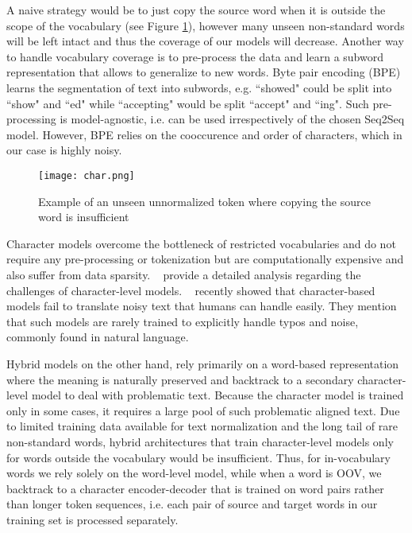 \documentclass[letterpaper]{article} \usepackage{aaai19}  \usepackage{times}  \usepackage{helvet} \usepackage{courier}  \usepackage[hyphens]{url}  \usepackage{graphicx} \urlstyle{rm} \def\UrlFont{\rm}  \usepackage{graphicx}  \frenchspacing  \setlength{\pdfpagewidth}{8.5in}  \setlength{\pdfpageheight}{11in}
\newcommand{\citet}[1]{\citeauthor{#1}~\shortcite{#1}}
\newcommand{\citep}{\cite}
\begin{document}
A naive strategy would be to just copy the source word when it is outside the scope of the vocabulary (see Figure \ref{fig:char}), however many unseen non-standard words will be left intact and thus the coverage of our models will decrease. Another way to handle vocabulary coverage is to pre-process the data and learn a subword representation that allows to generalize to new words. Byte pair encoding (BPE) \citep{sennrich2015neural} learns the segmentation of text into subwords, e.g. ``showed" could be split into ``show" and ``ed" while ``accepting" would be split ``accept" and ``ing". Such pre-processing is model-agnostic, i.e. can be used irrespectively of the chosen Seq2Seq model. However, BPE relies on the cooccurence and order of characters, which in our case is highly noisy. 

\begin{figure}[h]
    \centering
    \texttt{[image: char.png]}
    \caption{Example of an unseen unnormalized token where copying the source word is insufficient}
    \label{fig:char}
\end{figure}

Character models overcome the bottleneck of restricted vocabularies and do not require any pre-processing or tokenization but are computationally expensive and also suffer from data sparsity. \citet{chung2016character} provide a detailed analysis regarding the challenges of character-level models. \citet{belinkov2017synthetic} recently showed that character-based models fail to translate noisy text that humans can handle easily. They mention that such models are rarely trained to explicitly handle typos and noise, commonly found in natural language. 

Hybrid models on the other hand, rely primarily on a word-based representation where the meaning is naturally preserved and backtrack to a secondary character-level model to deal with problematic text. Because the character model is trained only in some cases, it requires a large pool of such problematic aligned text. Due to limited training data available for text normalization and the long tail of rare non-standard words, hybrid architectures that train character-level models only for words outside the vocabulary would be insufficient. Thus, for in-vocabulary words we rely solely on the word-level model, while when a word is OOV, we backtrack to a character encoder-decoder that is trained on word pairs rather than longer token sequences, i.e. each pair of source and target words in our training set is processed separately. 
\end{document}

